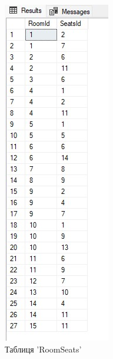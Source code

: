 \documentclass[a4paper,12pt]{article}
\begin{document}
	\begin{figure}[h!]
		\centering
		\begin{minipage}[h]{1\linewidth}
			\includegraphics[width=0.4\linewidth]{Prt sc/Figure_6.jpg}  
		\end{minipage}
		\caption{Таблиця 'RoomSeats'}
	\end{figure}
\end{document}
